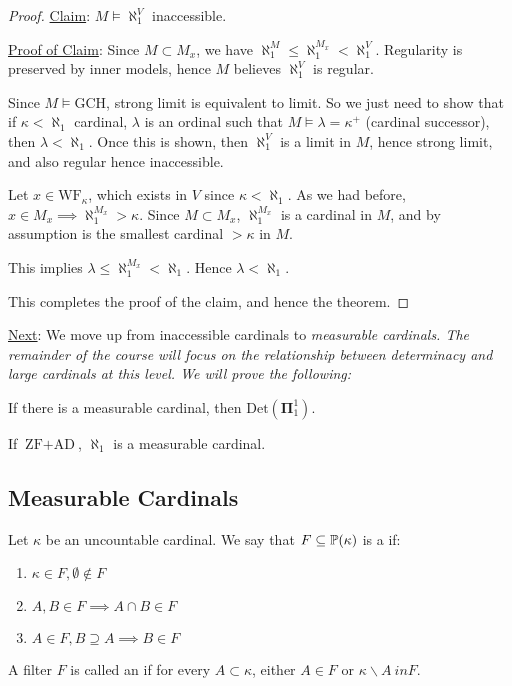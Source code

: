 \documentclass[]{article}
\newcommand{\bopi}{\bm{\Pi}}
\newcommand{\Det}{\textrm{Det}}
\newcommand{\wf}{\textrm{WF}}
\newcommand{\ad}{\textrm{AD}}
\newcommand{\zf}{\textrm{ZF}}
\begin{document}
\begin{proof}
    \underline{Claim}: $M\models \aleph_1^V$ inaccessible.

    \underline{Proof of Claim}: Since $M\subset M_x$, we have $\aleph_1^M \le \aleph_1^{M_x} < \aleph_1^V$. Regularity is preserved by inner models, hence $M$ believes $\aleph_1^V$ is regular.

    Since $M \models \textrm{GCH}$, strong limit is equivalent to limit. So we just need to show that if $\kappa < \aleph_1$ cardinal, $\lambda$ is an ordinal such that $M\models \lambda = \kappa^+$ (cardinal successor), then $\lambda < \aleph_1$. Once this is shown, then $\aleph_1^V$ is a limit in $M$, hence strong limit, and also regular hence inaccessible.

    Let $x \in \wf_\kappa$, which exists in $V$ since $\kappa < \aleph_1$. As we had before, $x \in M_x \implies \aleph_1^{M_x} > \kappa$. Since $M\subset M_x$, $\aleph_1^{M_x}$ is a cardinal in $M$, and by assumption is the smallest cardinal $>\kappa$ in $M$.

    This implies $\lambda \le \aleph_1^{M_x} < \aleph_1$. Hence $\lambda < \aleph_1$. \qedsymbol

    This completes the proof of the claim, and hence the theorem.
\end{proof}

\underline{Next}: We move up from inaccessible cardinals to \it{measurable cardinals}. The remainder of the course will focus on the relationship between determinacy and large cardinals at this level. We will prove the following:

\begin{remark*}[Theorem 1]
    If there is a measurable cardinal, then $\Det(\bopi^1_1)$.
\end{remark*}
\begin{remark*}[Theorem 2]
    If $\zf + \ad$, $\aleph_1$ is a measurable cardinal.
\end{remark*}


\subsection*{Measurable Cardinals}

Let $\kappa$ be an uncountable cardinal. We say that $F\subset \P(\kappa)$ is a  if:
\begin{enumerate}[label = (\alph*)]
    \item $\kappa\in F,\emptyset\not\in F$
    \item $A,B\in F \implies A\cap B \in F$
    \item $A\in F, B\supseteq A\implies B \in F$
\end{enumerate}
A filter $F$ is called an  if for every $A\subset \kappa$, either $A \in F$ or $\kappa\backslash A \ in F$.
\end{document}
